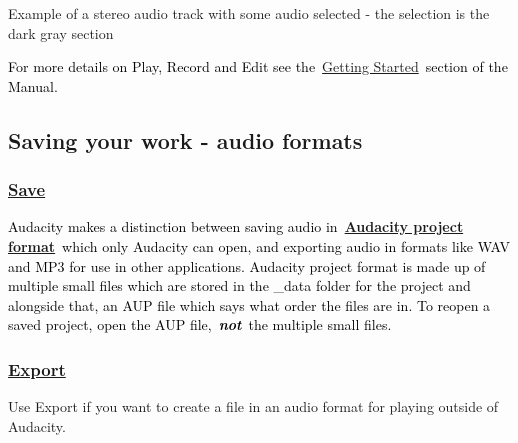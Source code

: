 \documentclass[letterpaper]{article}
\begin{document}
Example of a stereo audio track with some audio selected - the selection is the dark gray section

\textcolor{black}{For more details on Play, Record and Edit see
the~}\href{https://manual.audacityteam.org/quick_help.html}{\textcolor[rgb]{0.3529412,0.21176471,0.5882353}{Getting
Started}}\textcolor{black}{~section of the Manual.}

\subsection[Saving your work {}- audio formats]{\color{black} Saving your work - audio formats}
\subsubsection[Save]{\href{https://manual.audacityteam.org/man/file_menu.html\#save}{\textcolor[rgb]{0.3529412,0.21176471,0.5882353}{Save}}}
\textcolor{black}{Audacity makes a distinction between saving audio
in~}\href{https://manual.audacityteam.org/man/audacity_projects.html}{\textbf{\textcolor[rgb]{0.3529412,0.21176471,0.5882353}{Audacity
project format}}}\textcolor{black}{~which only Audacity can open, and exporting audio in formats like WAV and MP3 for
use in other applications. Audacity project format is made up of multiple small files which are stored in the \_data
folder for the project and alongside that, an AUP file which says what order the files are in. To reopen a saved
project, open the AUP file,~}\textbf{\textit{\textcolor{black}{not}}}\textcolor{black}{~the multiple small files.}

\subsubsection[Export]{\href{https://manual.audacityteam.org/man/file_export_dialog.html}{\textcolor[rgb]{0.3529412,0.21176471,0.5882353}{Export}}}
{\color{black}
Use Export if you want to create a file in an audio format for playing outside of Audacity.}
\end{document}
